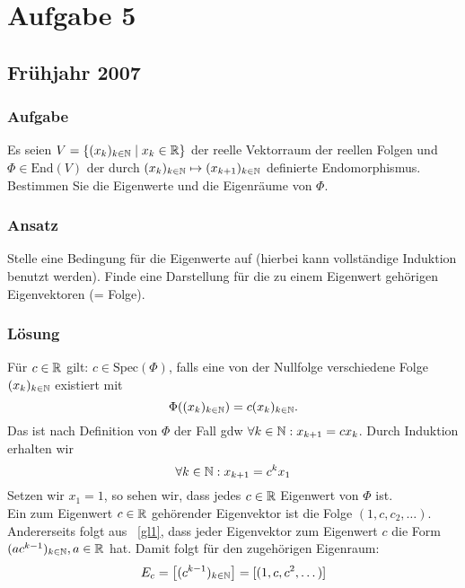 \chapter{Aufgabe 5}

\section{Frühjahr 2007}

\subsection{Aufgabe}
Es seien \( V = \{ (x_k)_{k \in \mathbb{N}} \mid x_k \in \mathbb{R} \} \) der reelle Vektorraum der reellen Folgen und \( \Phi \in \text{End}(V) \) der durch \( (x_k)_{k \in \mathbb{N}} \mapsto (x_{k+1})_{k \in \mathbb{N}} \) definierte Endomorphismus.
\\
Bestimmen Sie die Eigenwerte und die Eigenräume von \( \Phi \).

\subsection{Ansatz}
Stelle eine Bedingung für die Eigenwerte auf (hierbei kann vollständige Induktion benutzt werden). Finde eine Darstellung für die zu einem Eigenwert gehörigen Eigenvektoren (= Folge).

\subsection{Lösung}
Für \( c \in \mathbb{R} \) gilt: \( c \in \text{Spec}(\Phi) \), falls eine von der Nullfolge verschiedene Folge \( (x_k)_{k \in \mathbb{N}} \) existiert mit
\begin{equation*}
	\Phi((x_k)_{k \in \mathbb{N}}) = c(x_k)_{k \in \mathbb{N}}\text{.}
\end{equation*}
Das ist nach Definition von \( \Phi \) der Fall gdw \( \forall k \in \mathbb{N}: x_{k+1} = cx_k \). Durch Induktion erhalten wir
\begin{equation}
	\label{gl1}
	\forall k \in \mathbb{N}: x_{k+1} = c^kx_1
\end{equation}
Setzen wir \( x_1 = 1 \), so sehen wir, dass jedes \( c \in \mathbb{R} \) Eigenwert von \( \Phi \) ist.
\\
Ein zum Eigenwert \( c \in \mathbb{R} \) gehörender Eigenvektor ist die Folge \( (1, c, c_2, \dots) \).
\\
Andererseits folgt aus ~\ref{gl1}, dass jeder Eigenvektor zum Eigenwert \( c \) die Form \( (ac^{k-1})_{k \in \mathbb{N}}, a \in \mathbb{R} \) hat. Damit folgt für den zugehörigen Eigenraum:
\begin{equation*}
	E_c = \left[ (c^{k-1})_{k \in \mathbb{N}} \right] = [(1,c,c^2,\dots)]
\end{equation*}

